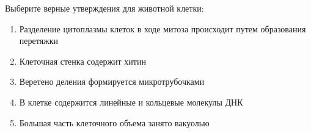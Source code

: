 
Выберите верные
утверждения для животной клетки:

\begin{enumerate}
    \item Разделение цитоплазмы клеток в ходе митоза происходит путем образования перетяжки
    \item Клеточная стенка содержит хитин
    \item Веретено деления формируется микротрубочками
    \item В клетке содержится линейные и кольцевые молекулы ДНК
    \item Большая часть клеточного объема занято вакуолью
\end{enumerate}


\explanationSection

